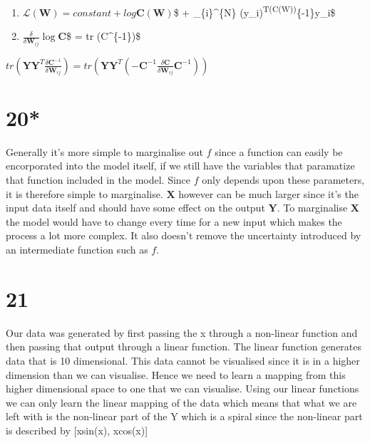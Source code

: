 \documentclass[11pt]{article}
\begin{document}
\begin{enumerate}
\def\labelenumi{\alph{enumi})}
\item
  \(\mathcal{L}(\pmb W) = constant + log\)\textbar{}\(\pmb C(\pmb W)\)\textbar{}\$
  + \sum\_\{i\}\^{}\{N\}
  (y\_i)\textsuperscript{T(\pmb C(\pmb W))}\{-1\}y\_i\$
\item
  \(\frac{\delta}{\delta\pmb W_{ij}}\log\)\textbar{}\(\pmb C\)\textbar{}\$
  = tr (\pmb C\^{}\{-1\})\$
\end{enumerate}

\(tr ( \pmb Y\pmb Y^T \frac{\delta\pmb C^{-1}}{\delta\pmb W_{ij}}) = tr ( \pmb Y\pmb Y^T (-\pmb C^{-1} \frac{\delta\pmb C}{\delta\pmb W_{ij}}\pmb C^{-1}))\)

    \section*{20*}\label{section}

Generally it's more simple to marginalise out \(f\) since a function can
easily be encorporated into the model itself, if we still have the
variables that paramatize that function included in the model. Since
\(f\) only depends upon these parameters, it is therefore simple to
marginalise. \(\boldsymbol{X}\) however can be much larger since it's
the input data itself and should have some effect on the output
\(\boldsymbol{Y}\). To marginalise \(\boldsymbol{X}\) the model would
have to change every time for a new input which makes the process a lot
more complex. It also doesn't remove the uncertainty introduced by an
intermediate function such as \(f\).

    \section*{21}\label{section}

Our data was generated by first passing the x through a non-linear
function and then passing that output through a linear function. The
linear function generates data that is 10 dimensional. This data cannot
be visualised since it is in a higher dimension than we can visualise.
Hence we need to learn a mapping from this higher dimensional space to
one that we can visualise. Using our linear functions we can only learn
the linear mapping of the data which means that what we are left with is
the non-linear part of the Y which is a spiral since the non-linear part
is described by {[}xsin(x), xcos(x){]}

    \begin{center}
    \end{center}
    { \hspace*{\fill} \\}
    
\end{document}
